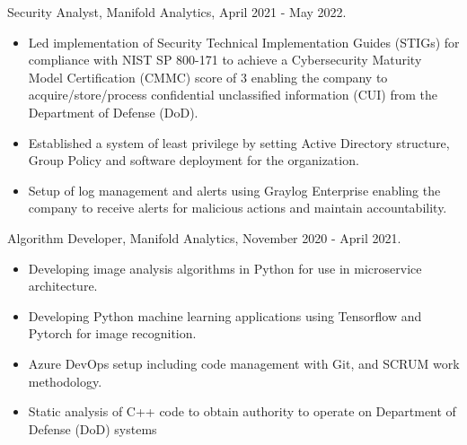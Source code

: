 \documentclass[12pt,a4paper]{article}
\begin{document}
Security Analyst, Manifold Analytics, April 2021 - May 2022.
\begin{itemize}
     \item Led implementation of Security Technical Implementation Guides (STIGs) for compliance with NIST SP 800-171 to achieve a Cybersecurity Maturity Model Certification (CMMC) score of 3 enabling the company to acquire/store/process confidential unclassified information (CUI) from the Department of Defense (DoD).
     \item Established a system of least privilege by setting Active Directory structure, Group Policy and software deployment for the organization.
     \item Setup of log management and alerts using Graylog Enterprise enabling the company to receive alerts for malicious actions and maintain accountability.
\end{itemize}

Algorithm Developer, Manifold Analytics, November 2020 - April 2021.
\begin{itemize}
    \item Developing image analysis algorithms in Python for use in microservice architecture.
    \item Developing Python machine learning applications using Tensorflow and Pytorch for image recognition.
    \item Azure DevOps setup including code management with Git, and SCRUM work methodology.
    \item Static analysis of C++ code to obtain authority to operate on Department of Defense (DoD) systems
\end{itemize}
    
    
\end{document}
